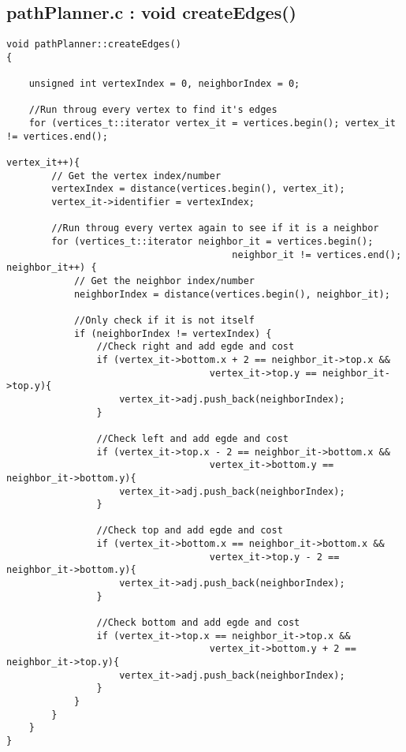 \subsection{pathPlanner.c : void createEdges()}
\label{app:createEdges}
\begin{minipage}{\linewidth}
\begin{lstlisting}
void pathPlanner::createEdges()
{

    unsigned int vertexIndex = 0, neighborIndex = 0;

    //Run throug every vertex to find it's edges
    for (vertices_t::iterator vertex_it = vertices.begin(); vertex_it != vertices.end();
    																		 vertex_it++){
		// Get the vertex index/number
        vertexIndex = distance(vertices.begin(), vertex_it);
        vertex_it->identifier = vertexIndex;
 
        //Run throug every vertex again to see if it is a neighbor
        for (vertices_t::iterator neighbor_it = vertices.begin(); 
        								neighbor_it != vertices.end(); neighbor_it++) {
    		// Get the neighbor index/number
            neighborIndex = distance(vertices.begin(), neighbor_it); 
            
            //Only check if it is not itself
            if (neighborIndex != vertexIndex) {
                //Check right and add egde and cost
                if (vertex_it->bottom.x + 2 == neighbor_it->top.x && 
                					vertex_it->top.y == neighbor_it->top.y){
                    vertex_it->adj.push_back(neighborIndex);
				}
				
                //Check left and add egde and cost
                if (vertex_it->top.x - 2 == neighbor_it->bottom.x && 
                					vertex_it->bottom.y == neighbor_it->bottom.y){
                    vertex_it->adj.push_back(neighborIndex);
				}
				              
                //Check top and add egde and cost
                if (vertex_it->bottom.x == neighbor_it->bottom.x && 
                					vertex_it->top.y - 2 == neighbor_it->bottom.y){
                    vertex_it->adj.push_back(neighborIndex);
				}
				
                //Check bottom and add egde and cost
                if (vertex_it->top.x == neighbor_it->top.x && 
                					vertex_it->bottom.y + 2 == neighbor_it->top.y){
                    vertex_it->adj.push_back(neighborIndex);
                }
            }
        }
    }
}
\end{lstlisting}~\\
\end{minipage}
